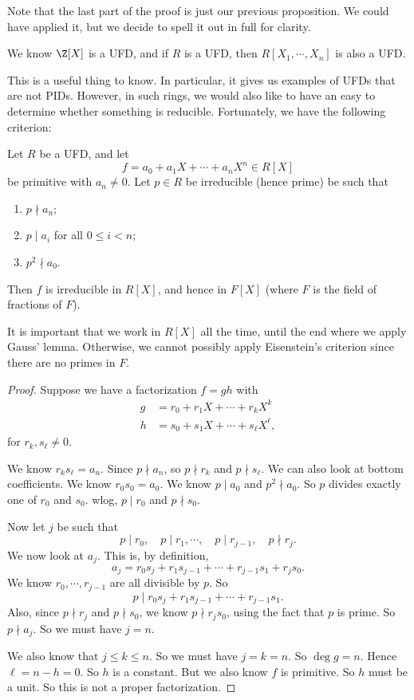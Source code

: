 \documentclass[a4paper]{article}
\begin{document}
Note that the last part of the proof is just our previous proposition. We could have applied it, but we decide to spell it out in full for clarity.

\begin{eg}
  We know $\Z[X]$ is a UFD, and if $R$ is a UFD, then $R[X_1, \cdots, X_n]$ is also a UFD.
\end{eg}

This is a useful thing to know. In particular, it gives us examples of UFDs that are not PIDs. However, in such rings, we would also like to have an easy to determine whether something is reducible. Fortunately, we have the following criterion:
\begin{prop}
  Let $R$ be a UFD, and let
  \[
    f = a_0 + a_1 X + \cdots + a_n X^n \in R[X]
  \]
  be primitive with $a_n \not= 0$. Let $p \in R$ be irreducible (hence prime) be such that
  \begin{enumerate}
    \item $p \nmid a_n$;
    \item $p \mid a_i$ for all $0 \leq i < n$;
    \item $p^2 \nmid a_0$.
  \end{enumerate}
  Then $f$ is irreducible in $R[X]$, and hence in $F[X]$ (where $F$ is the field of fractions of $F$).
\end{prop}
It is important that we work in $R[X]$ all the time, until the end where we apply Gauss' lemma. Otherwise, we cannot possibly apply Eisenstein's criterion since there are no primes in $F$.

\begin{proof}
  Suppose we have a factorization $f = gh$ with
  \begin{align*}
    g &= r_0 + r_1 X + \cdots + r_k X^k\\
    h &= s_0 + s_1 X + \cdots + s_\ell X^\ell,
  \end{align*}
  for $r_k, s_\ell \not= 0$.

  We know $r_k s_\ell = a_n$. Since $p \nmid a_n$, so $p \nmid r_k$ and $p \nmid s_\ell$. We can also look at bottom coefficients. We know $r_0 s_0 = a_0$. We know $p \mid a_0$ and $p^2 \nmid a_0$. So $p$ divides exactly one of $r_0$ and $s_0$. wlog, $p \mid r_0$ and $p \nmid s_0$.

  Now let $j$ be such that
  \[
    p \mid r_0,\quad p \mid r_1,\cdots,\quad p \mid r_{j - 1},\quad p \nmid r_j.
  \]
  We now look at $a_j$. This is, by definition,
  \[
    a_j = r_0 s_j + r_1 s_{j - 1} + \cdots + r_{j - 1} s_1 + r_j s_0.
  \]
  We know $r_0, \cdots, r_{j - 1}$ are all divisible by $p$. So
  \[
    p \mid r_0 s_j + r_1 s_{j - 1} + \cdots + r_{j - 1} s_1.
  \]
  Also, since $p \nmid r_j$ and $p \nmid s_0$, we know $p \nmid r_j s_0$, using the fact that $p$ is prime. So $p \nmid a_j$. So we must have $j = n$.

  We also know that $j \leq k \leq n$. So we must have $j = k = n$. So $\deg g = n$. Hence $\ell = n - h = 0$. So $h$ is a constant. But we also know $f$ is primitive. So $h$ must be a unit. So this is not a proper factorization.
\end{proof}
\end{document}
